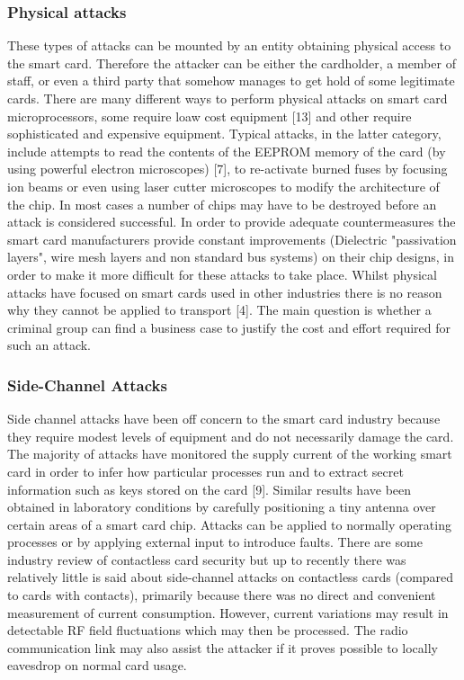 \documentclass[12pt]{article}
\begin{document}
\subsubsection{Physical attacks}
These types of attacks can be mounted by an entity
obtaining physical access to the smart card. Therefore
the attacker can be either the cardholder, a member of
staff, or even a third party that somehow manages to
get hold of some legitimate cards. \newline
There are many different ways to perform physical
attacks on smart card microprocessors, some require
loaw cost equipment [13] and other require
sophisticated and expensive equipment. Typical
attacks, in the latter category, include attempts to read
the contents of the EEPROM memory of the card (by
using powerful electron microscopes) [7], to re-activate
burned fuses by focusing ion beams or even using laser
cutter microscopes to modify the architecture of the
chip. In most cases a number of chips may have to be
destroyed before an attack is considered successful. In
order to provide adequate countermeasures the smart
card manufacturers provide constant improvements
(Dielectric "passivation layers", wire mesh layers and
non standard bus systems) on their chip designs, in
order to make it more difficult for these attacks to take
place. \newline
Whilst physical attacks have focused on smart cards
used in other industries there is no reason why they
cannot be applied to transport [4]. The main question is
whether a criminal group can find a business case to
justify the cost and effort required for such an attack.


\subsubsection{Side-Channel Attacks}
Side channel attacks have been off concern to the
smart card industry because they require modest levels
of equipment and do not necessarily damage the card.
The majority of attacks have monitored the supply
current of the working smart card in order to infer how
particular processes run and to extract secret
information such as keys stored on the card [9]. Similar
results have been obtained in laboratory conditions by
carefully positioning a tiny antenna over certain areas
of a smart card chip. Attacks can be applied to
normally operating processes or by applying external
input to introduce faults. \newline
There are some industry review of contactless card
security  but up to recently there was relatively
little is said about side-channel attacks on contactless
cards (compared to cards with contacts), primarily
because there was no direct and convenient
measurement of current consumption. However,
current variations may result in detectable RF field
fluctuations which may then be processed. The radio
communication link may also assist the attacker if it
proves possible to locally eavesdrop on normal card
usage.
\end{document}
